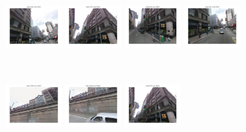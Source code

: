 \begin{figure}[t!]
\begin{minipage}{0.75\linewidth}
            \begin{minipage}{\linewidth} 
                \colorbox{myRed}{\includegraphics[trim = 35mm 30mm 35mm 30mm, clip=true, height=16mm]{imgs/Pval/exMix19/mixPval01.jpg}}
                \colorbox{myGreen}{\includegraphics[trim = 35mm 30mm 35mm 30mm, clip=true, height=16mm]{imgs/Pval/exMix19/mixPval02.jpg}}
                \colorbox{myGreen}{\includegraphics[trim = 35mm 30mm 35mm 30mm, clip=true, height=16mm]{imgs/Pval/exMix19/mixPval03.jpg}}
                \colorbox{myGreen}{\includegraphics[trim = 35mm 30mm 35mm 30mm, clip=true, height=16mm]{imgs/Pval/exMix19/mixPval04.jpg}}
            \end{minipage}
            \\
            \begin{minipage}{\linewidth}
                \colorbox{myRed}{\includegraphics[trim = 35mm 30mm 35mm 30mm, clip=true, height=16mm]{imgs/Pval/exMix19/mix01.jpg}}
                \colorbox{myRed}{\includegraphics[trim = 35mm 30mm 35mm 30mm, clip=true, height=16mm]{imgs/Pval/exMix19/mix02.jpg}}
                \colorbox{myGreen}{\includegraphics[trim = 35mm 30mm 35mm 30mm, clip=true, height=16mm]{imgs/Pval/exMix19/mix03.jpg}}

\end{minipage}
\end{minipage}
\end{figure}
